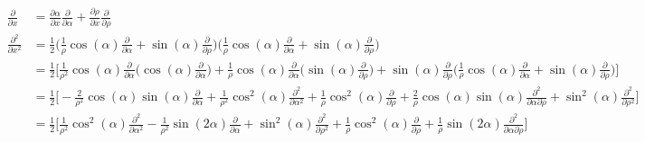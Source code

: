 \documentclass{article}
\begin{document}
\begin{subequations}
\begin{align*}
        \frac{\partial}{\partial x}        &= \frac{\partial\alpha}{\partial x} \frac{\partial}{\partial\alpha} +  \frac{\partial\rho}{\partial x} \frac{\partial}{\partial\rho} \\
        \frac{\partial^2}{\partial x^2} &= \frac{1}{2} \Big( \frac{1}{\rho} \cos(\alpha) \frac{\partial}{\partial\alpha} + \sin(\alpha) \frac{\partial}{\partial\rho}\Big) \Big( \frac{1}{\rho} \cos(\alpha) \frac{\partial}{\partial\alpha} + \sin(\alpha) \frac{\partial}{\partial\rho}\Big) \\
                                                     &= \frac{1}{2} \Big[ \frac{1}{\rho^2} \cos(\alpha) \frac{\partial}{\partial\alpha} \Big( \cos(\alpha) \frac{\partial}{\partial\alpha} \Big) + \frac{1}{\rho} \cos(\alpha) \frac{\partial}{\partial\alpha} \Big( \sin(\alpha) \frac{\partial}{\partial\rho} \Big) + \sin(\alpha) \frac{\partial}{\partial\rho} \Big( \frac{1}{\rho} \cos(\alpha) \frac{\partial}{\partial\alpha} + \sin(\alpha) \frac{\partial}{\partial\rho} \Big)   \Big] \\
                                                     &= \frac{1}{2} \Big[ -\frac{2}{\rho^2} \cos(\alpha) \sin(\alpha) \frac{\partial}{\partial\alpha} + \frac{1}{\rho^2} \cos^2(\alpha) \frac{\partial^2}{\partial\alpha^{2}} + \frac{1}{\rho} \cos^2(\alpha) \frac{\partial}{\partial\rho} + \frac{2}{\rho} \cos(\alpha)\sin(\alpha) \frac{\partial^2}{\partial\alpha \partial\rho} + \sin^2(\alpha) \frac{\partial^2}{\partial\rho^{2}}\Big] \\
                                                     &= \frac{1}{2} \Big[ \frac{1}{\rho^2} \cos^2(\alpha) \frac{\partial^2}{\partial\alpha^{2}} - \frac{1}{\rho^2} \sin(2\alpha) \frac{\partial}{\partial\alpha} + \sin^2(\alpha) \frac{\partial^2}{\partial\rho^{2}} + \frac{1}{\rho} \cos^2(\alpha) \frac{\partial}{\partial\rho} + \frac{1}{\rho} \sin(2\alpha) \frac{\partial^2}{\partial\alpha \partial\rho}\Big]
\end{align*}
\end{subequations}
\end{document}
